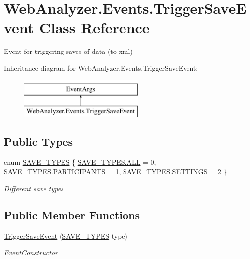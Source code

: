 \hypertarget{class_web_analyzer_1_1_events_1_1_trigger_save_event}{}\section{Web\+Analyzer.\+Events.\+Trigger\+Save\+Event Class Reference}
\label{class_web_analyzer_1_1_events_1_1_trigger_save_event}


Event for triggering saves of data (to xml)  


Inheritance diagram for Web\+Analyzer.\+Events.\+Trigger\+Save\+Event\+:\begin{figure}[H]
\begin{center}
\leavevmode
\includegraphics[height=2.000000cm]{class_web_analyzer_1_1_events_1_1_trigger_save_event}
\end{center}
\end{figure}
\subsection*{Public Types}
\begin{DoxyCompactItemize}
\item 
enum \hyperlink{class_web_analyzer_1_1_events_1_1_trigger_save_event_a4eec94af974a1711b6e32010e3e54c0d}{S\+A\+V\+E\+\_\+\+T\+Y\+P\+E\+S} \{ \hyperlink{class_web_analyzer_1_1_events_1_1_trigger_save_event_a4eec94af974a1711b6e32010e3e54c0da5fb1f955b45e38e31789286a1790398d}{S\+A\+V\+E\+\_\+\+T\+Y\+P\+E\+S.\+A\+L\+L} = 0, 
\hyperlink{class_web_analyzer_1_1_events_1_1_trigger_save_event_a4eec94af974a1711b6e32010e3e54c0da41d4e02780b46eeb797f488ec6ded226}{S\+A\+V\+E\+\_\+\+T\+Y\+P\+E\+S.\+P\+A\+R\+T\+I\+C\+I\+P\+A\+N\+T\+S} = 1, 
\hyperlink{class_web_analyzer_1_1_events_1_1_trigger_save_event_a4eec94af974a1711b6e32010e3e54c0daed6f7aca7887a927b9ed3d62aa347a86}{S\+A\+V\+E\+\_\+\+T\+Y\+P\+E\+S.\+S\+E\+T\+T\+I\+N\+G\+S} = 2
 \}\begin{DoxyCompactList}\small\item\em Different save types \end{DoxyCompactList}
\end{DoxyCompactItemize}
\subsection*{Public Member Functions}
\begin{DoxyCompactItemize}
\item 
\hyperlink{class_web_analyzer_1_1_events_1_1_trigger_save_event_aadd2b41f0dcf12aaa2e6258334e7d69a}{Trigger\+Save\+Event} (\hyperlink{class_web_analyzer_1_1_events_1_1_trigger_save_event_a4eec94af974a1711b6e32010e3e54c0d}{S\+A\+V\+E\+\_\+\+T\+Y\+P\+E\+S} type)
\begin{DoxyCompactList}\small\item\em Event\+Constructor \end{DoxyCompactList}\end{DoxyCompactItemize}
